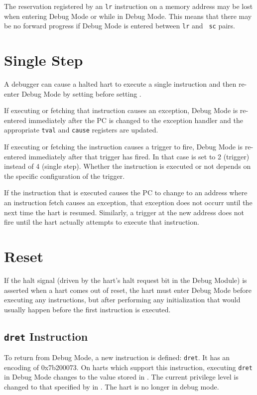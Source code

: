 The reservation registered by an {\tt lr} instruction on a memory address may
be lost when entering Debug Mode or while in Debug Mode.  This means that there
may be no forward progress if Debug Mode is entered between {\tt lr} and {\tt
sc} pairs.

\section{Single Step}

A debugger can cause a halted hart to execute a single instruction and then
re-enter Debug Mode by setting \Fstep before setting \Fresumereq.

If executing or fetching that instruction causes an exception, Debug Mode is
re-entered immediately after the PC is changed to the exception handler and the
appropriate {\tt tval} and {\tt cause} registers are updated.

If executing or fetching the instruction causes a trigger to fire, Debug Mode
is re-entered immediately after that trigger has fired. In that case \Fcause is
set to 2 (trigger) instead of 4 (single step).  Whether the instruction is
executed or not depends on the specific configuration of the trigger.

If the instruction that is executed causes the PC to change to an address where
an instruction fetch causes an exception, that exception does not occurr until
the next time the hart is resumed. Similarly, a trigger at the new address does
not fire until the hart actually attempts to execute that instruction.

\section{Reset}

If the halt signal (driven by the hart's halt request bit in the Debug Module)
is asserted when a hart comes out of reset, the hart must
enter Debug Mode before executing any instructions, but after performing any
initialization that would usually happen before the first instruction is
executed.

\subsection{{\tt dret} Instruction} \label{dret}

To return from Debug Mode, a new instruction is defined: {\tt dret}. It has an
encoding of 0x7b200073. On harts which support this instruction,
executing {\tt dret} in Debug Mode changes \Rpc to the value
stored in \Rdpc. The current privilege level is changed to that specified by
\Fprv in \Rdcsr. The hart is no longer in debug mode.

